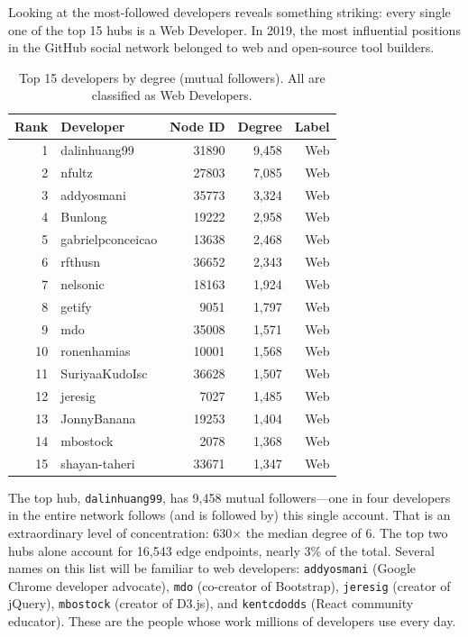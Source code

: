 \documentclass[letterpaper]{article}
\begin{document}
Looking at the most-followed developers reveals something striking: every single one of the top 15 hubs is a Web Developer. In 2019, the most influential positions in the GitHub social network belonged to web and open-source tool builders.

\begin{table}[H]
  \centering
  \begin{tabular}{rlrrr}
    \toprule
    \textbf{Rank} & \textbf{Developer} & \textbf{Node ID} & \textbf{Degree} & \textbf{Label} \\
    \midrule
    1  & dalinhuang99         & 31890 & 9,458 & Web \\
    2  & nfultz               & 27803 & 7,085 & Web \\
    3  & addyosmani           & 35773 & 3,324 & Web \\
    4  & Bunlong              & 19222 & 2,958 & Web \\
    5  & gabrielpconceicao    & 13638 & 2,468 & Web \\
    6  & rfthusn              & 36652 & 2,343 & Web \\
    7  & nelsonic             & 18163 & 1,924 & Web \\
    8  & getify               & 9051  & 1,797 & Web \\
    9  & mdo                  & 35008 & 1,571 & Web \\
    10 & ronenhamias          & 10001 & 1,568 & Web \\
    11 & SuriyaaKudoIsc       & 36628 & 1,507 & Web \\
    12 & jeresig              & 7027  & 1,485 & Web \\
    13 & JonnyBanana          & 19253 & 1,404 & Web \\
    14 & mbostock             & 2078  & 1,368 & Web \\
    15 & shayan-taheri        & 33671 & 1,347 & Web \\
    \bottomrule
  \end{tabular}
  \caption{Top 15 developers by degree (mutual followers). All are classified as Web Developers.}
  \label{tab:top_hubs}
\end{table}

The top hub, \texttt{dalinhuang99}, has 9,458 mutual followers---one in four developers in the entire network follows (and is followed by) this single account. That is an extraordinary level of concentration: 630$\times$ the median degree of 6. The top two hubs alone account for 16,543 edge endpoints, nearly 3\% of the total. Several names on this list will be familiar to web developers: \texttt{addyosmani} (Google Chrome developer advocate), \texttt{mdo} (co-creator of Bootstrap), \texttt{jeresig} (creator of jQuery), \texttt{mbostock} (creator of D3.js), and \texttt{kentcdodds} (React community educator). These are the people whose work millions of developers use every day.
\end{document}
